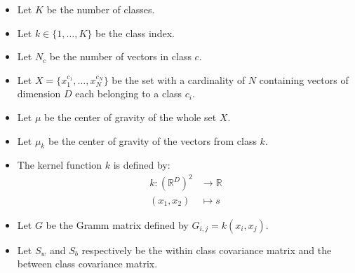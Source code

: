 
\begin{itemize}
  \item Let $K$ be the number of classes.
  \item Let $k \in \{1, \ldots, K\}$ be the class index. 
  \item Let $N_c$ be the number of vectors in class $c$.
  \item Let $X = \{x^{c_1}_1, \ldots, x^{c_N}_N\}$ be the set with a cardinality of $N$ containing vectors of dimension $D$ each belonging to a class $c_i$.
  \item Let $\mu$ be the center of gravity of the whole set $X$.
  \item Let $\mu_k$ be the center of gravity of the vectors from class $k$.
  \item The kernel function $k$ is defined by:
  	\begin{align*}
   		k : \left(\mathbb{R}^D\right)^2 &\to \mathbb{R}\\
   		(x_1, x_2) &\mapsto s 
   	\end{align*}
  \item Let $G$ be the Gramm matrix defined by $G_{i,j} = k(x_i, x_j)$.
  \item Let $S_w$ and $S_b$ respectively be the within class covariance matrix and the between class covariance matrix. 
\end{itemize}

